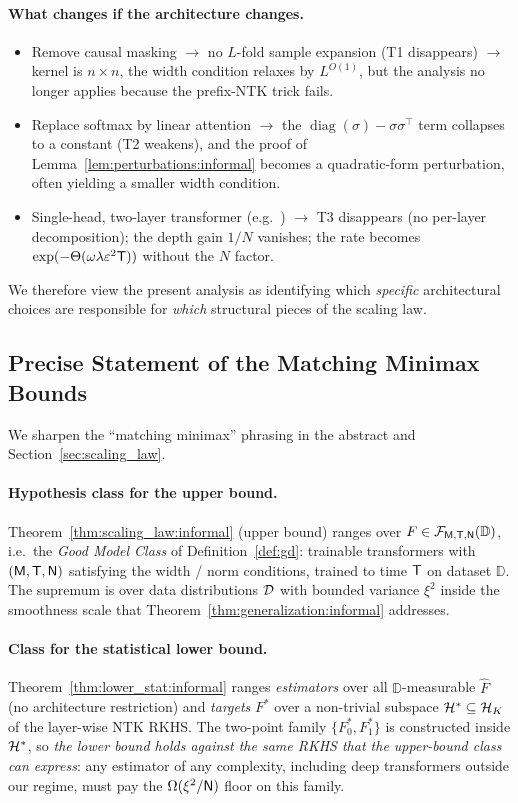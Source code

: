 \documentclass[11pt]{article}
\let\citet\citep
\theoremstyle{plain}
\newcommand{\wh}{\widehat}
\renewcommand{\hat}{\wh}
\DeclareMathOperator{\diag}{diag}
\begin{document}
\paragraph{What changes if the architecture changes.}
\begin{itemize}
    \item Remove causal masking $\to$ no $L$-fold sample expansion (T1 disappears) $\to$ kernel is $n\times n$, the width condition relaxes by $L^{O(1)}$, but the analysis no longer applies because the prefix-NTK trick fails.
    \item Replace softmax by linear attention $\to$ the $\diag(\sigma)-\sigma\sigma^\top$ term collapses to a constant (T2 weakens), and the proof of Lemma~\ref{lem:perturbations:informal} becomes a quadratic-form perturbation, often yielding a smaller width condition.
    \item Single-head, two-layer transformer (e.g.\ \citet{lhh+24_sign_gd}) $\to$ T3 disappears (no per-layer decomposition); the depth gain $1/N$ vanishes; the rate becomes $\exp(-\Theta(\omega\lambda \varepsilon^2 {\sf T}))$ without the $N$ factor.
\end{itemize}
We therefore view the present analysis as identifying which {\it specific} architectural choices are responsible for {\it which} structural pieces of the scaling law.

\subsection{Precise Statement of the Matching Minimax Bounds}\label{app_sub:matching_precise}

We sharpen the ``matching minimax'' phrasing in the abstract and Section~\ref{sec:scaling_law}.

\paragraph{Hypothesis class for the upper bound.}
Theorem~\ref{thm:scaling_law:informal} (upper bound) ranges over $F\in {\cal F}_{{\sf M},{\sf T},{\sf N}}(\mathbb{D})$, i.e.\ the {\it Good Model Class} of Definition~\ref{def:gd}: trainable transformers with $({\sf M},{\sf T},{\sf N})$ satisfying the width / norm conditions, trained to time ${\sf T}$ on dataset $\mathbb{D}$. The supremum is over data distributions ${\cal D}$ with bounded variance $\xi^2$ inside the smoothness scale that Theorem~\ref{thm:generalization:informal} addresses.

\paragraph{Class for the statistical lower bound.}
Theorem~\ref{thm:lower_stat:informal} ranges {\it estimators} over all $\mathbb{D}$-measurable $\hat F$ (no architecture restriction) and {\it targets} $F^*$ over a non-trivial subspace ${\cal H}^*\subseteq{\cal H}_K$ of the layer-wise NTK RKHS. The two-point family $\{F_0^*,F_1^*\}$ is constructed inside ${\cal H}^*$, so {\it the lower bound holds against the same RKHS that the upper-bound class can express}: any estimator of any complexity, including deep transformers outside our regime, must pay the $\Omega(\xi^2/{\sf N})$ floor on this family.
\end{document}
